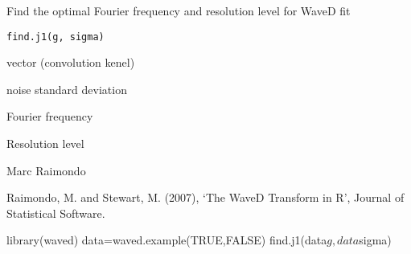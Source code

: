 \begin{Description}\relax
Find the optimal Fourier frequency and resolution
level for WaveD fit
\end{Description}
\begin{Usage}
\begin{verbatim}
find.j1(g, sigma)
\end{verbatim}
\end{Usage}
\begin{Arguments}
\begin{ldescription}
\item[\code{g}] vector (convolution kenel)
\item[\code{sigma}] noise standard deviation 
\end{ldescription}
\end{Arguments}
\begin{Value}
\begin{ldescription}
\item[\code{M}] Fourier frequency
\item[\code{j1}] Resolution level
\end{ldescription}
\end{Value}
\begin{Author}\relax
Marc Raimondo
\end{Author}
\begin{References}\relax
Raimondo, M. and Stewart, M. (2007),
`The WaveD Transform in R', Journal of Statistical Software.
\end{References}
\begin{SeeAlso}\relax
{}
\end{SeeAlso}
\begin{Examples}
\begin{ExampleCode}
library(waved)
data=waved.example(TRUE,FALSE)
find.j1(data$g,data$sigma)

\end{ExampleCode}
\end{Examples}

